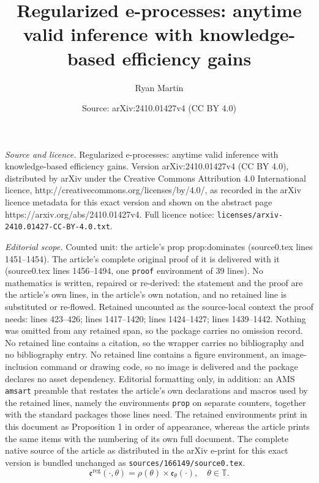 \documentclass[10pt,a4paper]{amsart}
\title{Regularized e-processes: anytime valid inference with knowledge-based efficiency gains}
\author{Ryan Martin}
\date{Source: arXiv:2410.01427v4 (CC BY 4.0)}
\newcommand{\TT}{\mathbb{T}}
\newcommand{\eval}{\mathfrak{e}}
\begin{document}
\maketitle

\noindent\emph{Source and licence.} Regularized e-processes: anytime valid inference with knowledge-based efficiency gains. Version arXiv:2410.01427v4 (CC BY 4.0), distributed by arXiv under the Creative Commons Attribution 4.0 International licence, http://creativecommons.org/licenses/by/4.0/, as recorded in the arXiv licence metadata for this exact version and shown on the abstract page https://arxiv.org/abs/2410.01427v4. Full licence notice: \texttt{licenses/arxiv-2410.01427-CC-BY-4.0.txt}.\par\smallskip

\noindent\textit{Editorial scope.} Counted unit: the article's prop prop:dominates (source0.tex lines 1451--1454). The article's complete original proof of it is delivered with it (source0.tex lines 1456--1494, one \texttt{proof} environment of 39 lines). No mathematics is written, repaired or re-derived: the statement and the proof are the article's own lines, in the article's own notation, and no retained line is substituted or re-flowed.  Retained uncounted as the source-local context the proof needs: lines 423--426; lines 1417--1420; lines 1424--1427; lines 1439--1442.  Nothing was omitted from any retained span, so the package carries no omission record.  No retained line contains a citation, so the wrapper carries no bibliography and no bibliography entry.  No retained line contains a figure environment, an image-inclusion command or drawing code, so no image is delivered and the package declares no asset dependency.  Editorial formatting only, in addition: an AMS \texttt{amsart} preamble that restates the article's own declarations and macros used by the retained lines, namely the environments \texttt{prop} on separate counters, together with the standard packages those lines need.  The retained environments print in this document as Proposition 1 in order of appearance, whereas the article prints the same items with the numbering of its own full document.  The complete native source of the article as distributed in the arXiv e-print for this exact version is bundled unchanged as \texttt{sources/166149/source0.tex}.
\begin{equation}
\label{eq:reg.eprocess}
\eval^\text{reg}(\cdot, \theta) = \rho(\theta) \times \eval_\theta(\cdot), \quad \theta \in \TT.
\end{equation}
\end{document}
